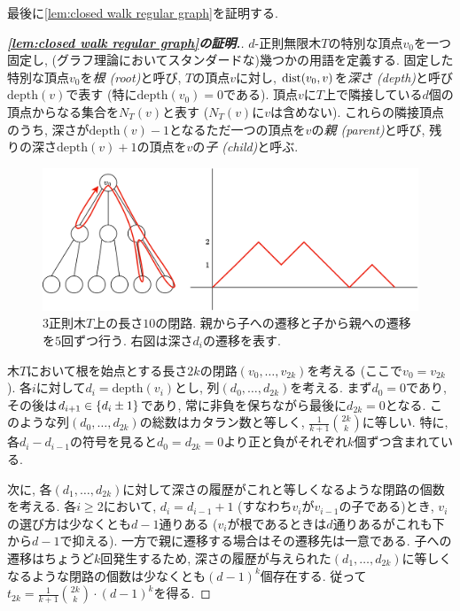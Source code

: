 最後に\cref{lem:closed walk regular graph}を証明する.
\begin{proof}[\textbf{\cref{lem:closed walk regular graph}の証明.}]
    $d$-正則無限木$T$の特別な頂点$v_0$を一つ固定し, (グラフ理論においてスタンダードな)幾つかの用語を定義する.
    固定した特別な頂点$v_0$を\emph{根 (root)}と呼び,
    $T$の頂点$v$に対し, $\mathrm{dist}(v_0,v)$を\emph{深さ (depth)}と呼び$\mathrm{depth}(v)$で表す (特に$\mathrm{depth}(v_0)=0$である).
    頂点$v$に$T$上で隣接している$d$個の頂点からなる集合を$N_T(v)$と表す ($N_T(v)$に$v$は含めない).
    これらの隣接頂点のうち, 深さが$\mathrm{depth}(v)-1$となるただ一つの頂点を$v$の\emph{親 (parent)}と呼び,
    残りの深さ$\mathrm{depth}(v)+1$の頂点を$v$の\emph{子 (child)}と呼ぶ.

    \begin{figure}
        \begin{center}
            \includegraphics[width=12cm]{images/tree.png}
            \caption{$3$正則木$T$上の長さ$10$の閉路. 親から子への遷移と子から親への遷移を$5$回ずつ行う. 右図は深さ$d_i$の遷移を表す.}
        \end{center}
    \end{figure}

    木$T$において根を始点とする長さ$2k$の閉路$(v_0,\dots,v_{2k})$を考える (ここで$v_0=v_{2k}$).
    各$i$に対して$d_i = \mathrm{depth}(v_i)$とし, 列$(d_0,\dots,d_{2k})$を考える.
    まず$d_0=0$であり, その後は$d_{i+1} \in \lbrace d_i \pm 1\rbrace$であり, 常に非負を保ちながら最後に$d_{2k}=0$となる.
    このような列$(d_0,\dots,d_{2k})$の総数はカタラン数と等しく, $\frac{1}{k+1}\binom{2k}{k}$に等しい.
    特に, 各$d_i - d_{i-1}$の符号を見ると$d_0 = d_{2k} = 0$より正と負がそれぞれ$k$個ずつ含まれている.

    次に, 各$(d_1,\dots,d_{2k})$に対して深さの履歴がこれと等しくなるような閉路の個数を考える.
    各$i\ge 2$において, $d_i=d_{i-1}+1$ (すなわち$v_i$が$v_{i-1}$の子である)とき, $v_i$の選び方は少なくとも$d-1$通りある ($v_i$が根であるときは$d$通りあるがこれも下から$d-1$で抑える).
    一方で親に遷移する場合はその遷移先は一意である.
    子への遷移はちょうど$k$回発生するため, 深さの履歴が与えられた$(d_1,\dots,d_{2k})$に等しくなるような閉路の個数は少なくとも$(d-1)^{k}$個存在する.
    従って$t_{2k} = \frac{1}{k+1}\binom{2k}{k} \cdot (d-1)^{k}$を得る.


\end{proof}
